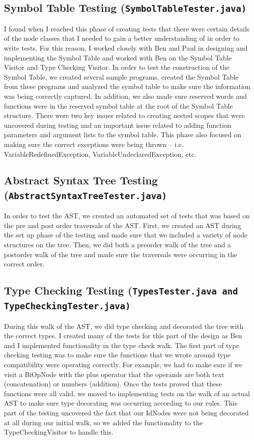 \documentclass{book}
\begin{document}
\subsection*{Symbol Table Testing (\tt SymbolTableTester.java\rm)}
I found when I reached this phase of creating tests that there were certain details of the node classes that I needed to gain a better understanding of in order to write tests. For this reason, I worked closely with Ben and Paul in designing and implementing the Symbol Table and worked with Ben on the Symbol Table Visitor and Type Checking Visitor. In order to test the construction of the Symbol Table, we created several sample programs, created the Symbol Table from these programs and analyzed the symbol table to make sure the information was being correctly captured. In addition, we also made sure reserved words and functions were in the reserved symbol table at the root of the Symbol Table structure. There were two key issues related to creating nested scopes that were uncovered during testing and an important issue related to adding function parameters and argument lists to the symbol table. This phase also focused on making sure the correct exceptions were being thrown – i.e. VariableRedefinedException, VariableUndeclaredException, etc.

\subsection*{Abstract Syntax Tree Testing (\tt AbstractSyntaxTreeTester.java\rm)}

In order to test the AST, we created an automated set of tests that was based on the pre and post order traversals of the AST. First, we created an AST during the set up phase of the testing and made sure that we included a variety of node structures on the tree. Then, we did both a preorder walk of the tree and a postorder walk of the tree and made sure the traversals were occurring in the correct order.  

\subsection*{Type Checking Testing (\tt TypesTester.java\rm \,and \tt  TypeCheckingTester.java\rm)}

During this walk of the AST, we did type checking and decorated the tree with the correct types. I created many of the tests for this part of the design as Ben and I implemented functionality in the type check walk. The first part of type checking testing was to make sure the functions that we wrote around type compatibility were operating correctly. For example, we had to make sure if we visit a BiOpNode with the plus operator that the operands are both text (concatenation) or numbers (addition). Once the tests proved that these functions were all valid, we moved to implementing tests on the walk of an actual AST to make sure type decorating was occurring according to our rules. This part of the testing uncovered the fact that our IdNodes were not being decorated at all during our initial walk, so we added the functionality to the TypeCheckingVisitor to handle this.  
\end{document}
